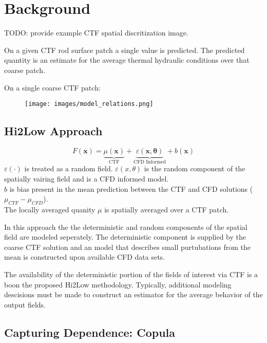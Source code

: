 

\section{Background}

TODO: provide example CTF spatial discritization image.

On a given CTF rod surface patch a single value is predicted.  The predicted quantity is an estimate for the average thermal hydraulic conditions over that coarse patch.

On a single coarse CTF patch:
\begin{figure}[!htbp]
\centering
\texttt{[image: images/model\_relations.png]}
\label{model_overview}
\end{figure}

\subsection{Hi2Low Approach}
\begin{equation}
    F(\mathbf x) = \underbrace{\mu(\mathbf{x})}_\text{CTF} + \underbrace{\varepsilon(\mathbf{x, \theta})}_\text{CFD Informed} + b(\mathbf{x})
\end{equation}
 $ \varepsilon(\cdot) $ is treated as a random field.  $\varepsilon(x, \theta)$ is the random component of the spatially vairing field and is a CFD informed model. \\
$b$ is bias present in the mean prediction between the CTF and CFD solutions ($\mu_{CTF} - \mu_{CFD}$). \\
The locally averaged quanity $\mu$ is spatially averaged over a CTF patch.

In this approach the the deterministic and random components of the spatial field are modeled seperately.  The deterministic component is supplied by the coarse CTF solution and an model that describes small purtubations from the mean is constructed upon available CFD data sets.

The availability of the deterministic portion of the fields of interest via CTF is a boon the proposed Hi2Low methodology.  Typically, additional modeling descisions must be made to construct an estimator for the average behavior of the output fields.

\subsection{Capturing Dependence: Copula}

